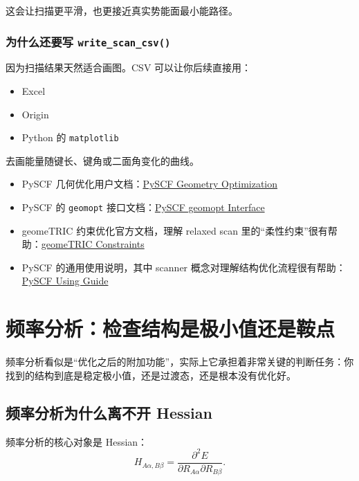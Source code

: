 \documentclass[UTF8,11pt,fontset=fandol]{ctexbook}
\begin{document}
这会让扫描更平滑，也更接近真实势能面最小能路径。

\subsection*{为什么还要写 \texttt{write\_scan\_csv()}}

因为扫描结果天然适合画图。CSV 可以让你后续直接用：
\begin{itemize}
  \item Excel
  \item Origin
  \item Python 的 \texttt{matplotlib}
\end{itemize}
去画能量随键长、键角或二面角变化的曲线。

\begin{resourcebox}[继续学习资料]
\begin{itemize}
  \item PySCF 几何优化用户文档：\href{https://pyscf.org/user/geomopt.html}{PySCF Geometry Optimization}
  \item PySCF 的 \texttt{geomopt} 接口文档：\href{https://pyscf.org/interface/geomopt.html}{PySCF geomopt Interface}
  \item geomeTRIC 约束优化官方文档，理解 relaxed scan 里的“柔性约束”很有帮助：\href{https://geometric.readthedocs.io/en/latest/constraints.html}{geomeTRIC Constraints}
  \item PySCF 的通用使用说明，其中 scanner 概念对理解结构优化流程很有帮助：\href{https://pyscf.org/user/using.html}{PySCF Using Guide}
\end{itemize}
\end{resourcebox}

\chapter{频率分析：检查结构是极小值还是鞍点}

\begin{goalbox}[本章目标]
频率分析看似是“优化之后的附加功能”，实际上它承担着非常关键的判断任务：你找到的结构到底是稳定极小值，还是过渡态，还是根本没有优化好。
\end{goalbox}

\section{频率分析为什么离不开 Hessian}

频率分析的核心对象是 Hessian：
\begin{equation}
H_{A\alpha,B\beta}
=
\frac{\partial^2 E}{\partial R_{A\alpha}\partial R_{B\beta}}.
\end{equation}
\end{document}
